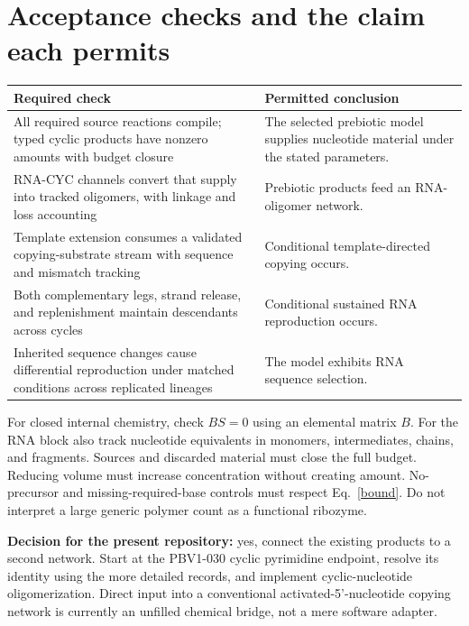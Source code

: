 \documentclass[11pt]{article}
\begin{document}
\section{Acceptance checks and the claim each permits}
\begin{longtable}{p{}p{}}
\toprule
Required check & Permitted conclusion \\
\midrule
All required source reactions compile; typed cyclic products have nonzero
amounts with budget closure & The selected prebiotic model supplies nucleotide
material under the stated parameters. \\
RNA-CYC channels convert that supply into tracked oligomers, with linkage and
loss accounting & Prebiotic products feed an RNA-oligomer network. \\
Template extension consumes a validated copying-substrate stream with sequence
and mismatch tracking & Conditional template-directed copying occurs. \\
Both complementary legs, strand release, and replenishment maintain descendants
across cycles & Conditional sustained RNA reproduction occurs. \\
Inherited sequence changes cause differential reproduction under matched
conditions across replicated lineages & The model exhibits RNA sequence selection. \\
\bottomrule
\end{longtable}
For closed internal chemistry, check $BS=0$ using an elemental matrix $B$.
For the RNA block also track nucleotide equivalents in monomers, intermediates,
chains, and fragments. Sources and discarded material must close the full
budget. Reducing volume must increase concentration without creating amount.
No-precursor and missing-required-base controls must respect Eq.~\eqref{bound}.
Do not interpret a large generic polymer count as a functional ribozyme.

\textbf{Decision for the present repository:} yes, connect the existing products
to a second network. Start at the PBV1-030 cyclic pyrimidine endpoint, resolve
its identity using the more detailed records, and implement cyclic-nucleotide
oligomerization. Direct input into a conventional activated-5'-nucleotide copying
network is currently an unfilled chemical bridge, not a mere software adapter.
\end{document}
